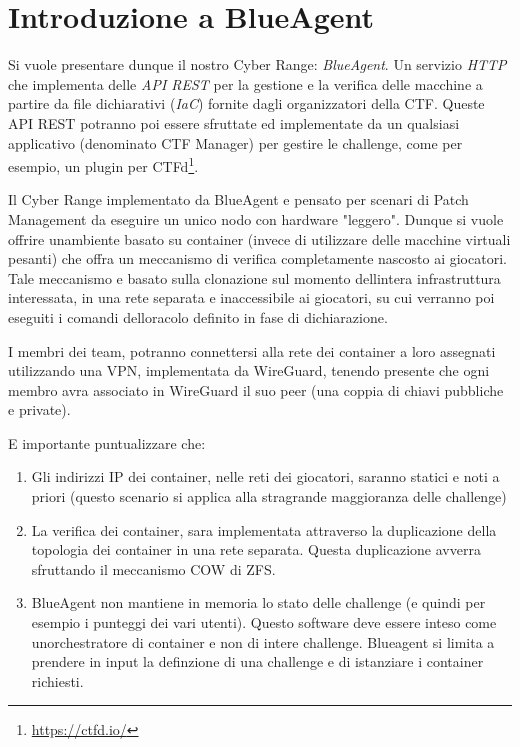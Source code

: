 \section{Introduzione a BlueAgent}\label{introduzione-a-blueagent}

Si vuole presentare dunque il nostro Cyber Range: \emph{BlueAgent}. Un
servizio \emph{HTTP} che implementa delle \emph{API REST} per la
gestione e la verifica delle macchine a partire da file dichiarativi
(\emph{IaC}) fornite dagli organizzatori della CTF. Queste API REST
potranno poi essere sfruttate ed implementate da un qualsiasi
applicativo (denominato CTF Manager) per gestire le challenge, come per
esempio, un plugin per CTFd\footnote{\label{fn:ref_14}\url{https://ctfd.io/}}.

Il Cyber Range implementato da BlueAgent e\textquotesingle{} pensato per
scenari di Patch Management da eseguire un unico nodo con hardware
"leggero". Dunque si vuole offrire un\textquotesingle ambiente basato su
container (invece di utilizzare delle macchine virtuali pesanti) che
offra un meccanismo di verifica completamente nascosto ai giocatori.
Tale meccanismo e\textquotesingle{} basato sulla clonazione sul momento
dell\textquotesingle intera infrastruttura interessata, in una rete
separata e inaccessibile ai giocatori, su cui verranno poi eseguiti i
comandi dell\textquotesingle oracolo definito in fase di dichiarazione.

I membri dei team, potranno connettersi alla rete dei container a loro
assegnati utilizzando una VPN, implementata da WireGuard, tenendo
presente che ogni membro avra associato in WireGuard il suo peer (una
coppia di chiavi pubbliche e private).

E\textquotesingle{} importante puntualizzare che:

\begin{enumerate}
\def\labelenumi{\arabic{enumi}.}
\tightlist
\item
  Gli indirizzi IP dei container, nelle reti dei giocatori, saranno
  statici e noti a priori (questo scenario si applica alla stragrande
  maggioranza delle challenge)
\item
  La verifica dei container, sara implementata attraverso la
  duplicazione della topologia dei container in una rete separata.
  Questa duplicazione avverra sfruttando il meccanismo COW di ZFS.
\item
  BlueAgent non mantiene in memoria lo stato delle challenge (e quindi
  per esempio i punteggi dei vari utenti). Questo software deve essere
  inteso come un\textquotesingle orchestratore di container e non di
  intere challenge. Blueagent si limita a prendere in input la
  definzione di una challenge e di istanziare i container richiesti.
\end{enumerate}

